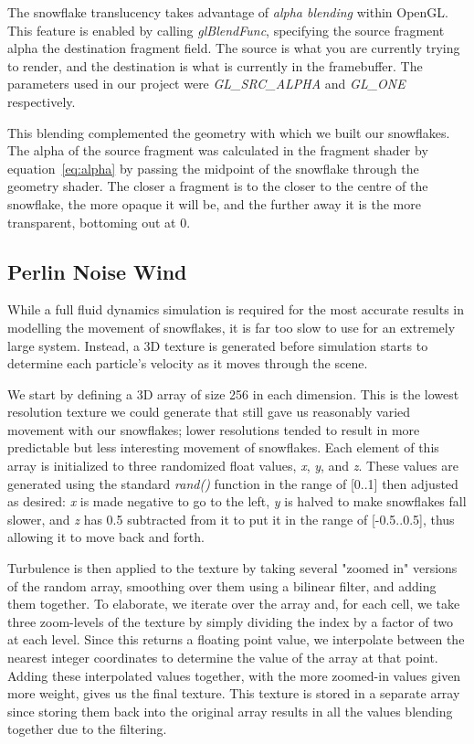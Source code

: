 \documentclass[conference]{acmsiggraph}
\begin{document}
The snowflake translucency takes advantage of \textit{alpha blending} within OpenGL. This feature is enabled by calling \textit{glBlendFunc}, specifying the source fragment alpha the destination fragment field. The source is what you are currently trying to render, and the destination is what is currently in the framebuffer. The parameters used in our project were \textit{GL\_SRC\_ALPHA}  and \textit{GL\_ONE} respectively.

This blending complemented the geometry with which we built our snowflakes. The alpha of the source fragment was calculated in the fragment shader by equation~\ref{eq:alpha} by passing the midpoint of the snowflake through the geometry shader. The closer a fragment is to the closer to the centre of the snowflake, the more opaque it will be, and the further away it is the more transparent, bottoming out at 0.

\subsection{Perlin Noise Wind}
While a full fluid dynamics simulation is required for the most accurate results in modelling the movement of snowflakes, it is far too slow to use for an extremely large system. Instead, a 3D texture is generated before simulation starts to determine each particle's velocity as it moves through the scene.

We start by defining a 3D array of size 256 in each dimension. This is the lowest resolution texture we could generate that still gave us reasonably varied movement with our snowflakes; lower resolutions tended to result in more predictable but less interesting movement of snowflakes. Each element of this array is initialized to three randomized float values, \textit{x}, \textit{y}, and \textit{z}. These values are generated using the standard \textit{rand()} function in the range of [0..1] then adjusted as desired: \textit{x} is made negative to go to the left, \textit{y} is halved to make snowflakes fall slower, and \textit{z} has 0.5 subtracted from it to put it in the range of [-0.5..0.5], thus allowing it to move back and forth.

Turbulence is then applied to the texture by taking several "zoomed in" versions of the random array, smoothing over them using a bilinear filter, and adding them together. To elaborate, we iterate over the array and, for each cell, we take three zoom-levels of the texture by simply dividing the index by a factor of two at each level. Since this returns a floating point value, we interpolate between the nearest integer coordinates to determine the value of the array at that point. Adding these interpolated values together, with the more zoomed-in values given more weight, gives us the final texture. This texture is stored in a separate array since storing them back into the original array results in all the values blending together due to the filtering.
\end{document}

